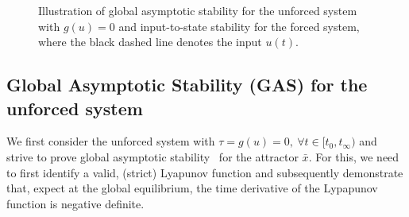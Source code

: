 
\begin{figure}[t]
    \centering
    \caption{Illustration of global asymptotic stability for the unforced system with $g(u)=0$ and input-to-state stability for the forced system, where the black dashed line denotes the input $u(t)$.}
    \label{fig:con:gas_iss_illustration}
\end{figure}

\subsection{Global Asymptotic Stability (GAS) for the unforced system} 
We first consider the unforced system with $\tau = g(u) = 0, \: \forall t \in [t_0, t_\infty)$ and strive to prove global asymptotic stability~\cite{khalil2002nonlinear} for the attractor $\bar{x}$.
For this, we need to first identify a valid, (strict) Lyapunov function and subsequently demonstrate that, expect at the global equilibrium, the time derivative of the Lypapunov function is negative definite.

